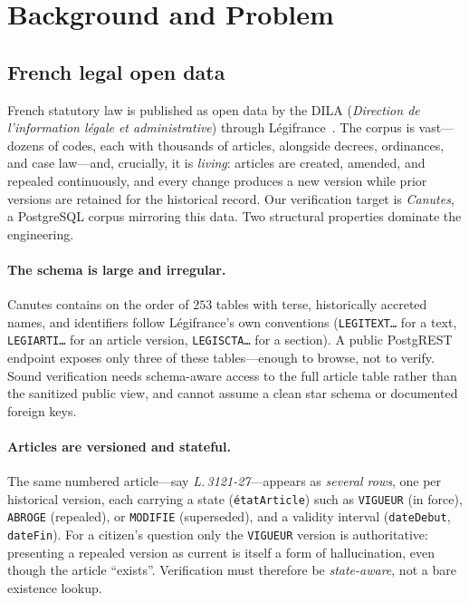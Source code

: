 \section{Background and Problem}
\label{sec:background}

\subsection{French legal open data}
French statutory law is published as open data by the DILA (\emph{Direction de
l'information légale et administrative}) through
Légifrance~\cite{legifrance}. The corpus is vast---dozens of codes, each with
thousands of articles, alongside decrees, ordinances, and case law---and,
crucially, it is \emph{living}: articles are created, amended, and repealed
continuously, and every change produces a new version while prior versions are
retained for the historical record. Our verification target is \emph{Canutes},
a PostgreSQL corpus mirroring this data. Two structural properties dominate the
engineering.

\paragraph{The schema is large and irregular.}
Canutes contains on the order of $253$ tables with terse, historically
accreted names, and identifiers follow Légifrance's own conventions
(\texttt{LEGITEXT\ldots} for a text, \texttt{LEGIARTI\ldots} for an article
version, \texttt{LEGISCTA\ldots} for a section). A public
PostgREST~\cite{postgrest} endpoint exposes only three of these
tables---enough to browse, not to verify. Sound verification needs
schema-aware access to the full article table rather than the sanitized public
view, and cannot assume a clean star schema or documented foreign keys.

\paragraph{Articles are versioned and stateful.}
The same numbered article---say \emph{L.\,3121-27}---appears as \emph{several
rows}, one per historical version, each carrying a state
(\texttt{étatArticle}) such as \texttt{VIGUEUR} (in force), \texttt{ABROGE}
(repealed), or \texttt{MODIFIE} (superseded), and a validity interval
(\texttt{dateDebut}, \texttt{dateFin}). For a citizen's question only the
\texttt{VIGUEUR} version is authoritative: presenting a repealed version as
current is itself a form of hallucination, even though the article ``exists''.
Verification must therefore be \emph{state-aware}, not a bare existence lookup.

